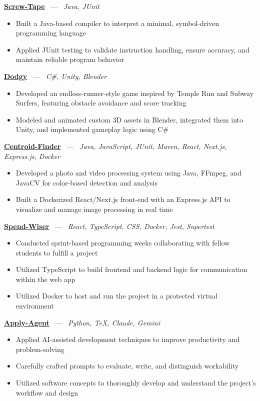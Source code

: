 \documentclass[10pt, letterpaper]{article}
\newcommand{\projhead}[3]{%
  \vspace{5pt}%
  {\bfseries\color{dark}\href{#2}{#1}}%
  ~{\color{light}---}~%
  {\color{light}\small\textit{#3}}\\[-2pt]%
}
\begin{document}
\projhead{Screw-Tape}{https://github.com/timmyd4/screwtape}{Java, JUnit}
\begin{itemize}
  \item Built a Java-based compiler to interpret a minimal, symbol-driven programming language
  \item Applied JUnit testing to validate instruction handling, ensure accuracy, and maintain reliable program behavior
\end{itemize}

\projhead{Dodgy}{https://timyd.itch.io/dodgy}{C\#, Unity, Blender}
\begin{itemize}
  \item Developed an endless-runner-style game inspired by Temple Run and Subway Surfers, featuring obstacle avoidance and score tracking
  \item Modeled and animated custom 3D assets in Blender, integrated them into Unity, and implemented gameplay logic using C\#
\end{itemize}

\projhead{Centroid-Finder}{https://github.com/xavierb117/centroid-finder}{Java, JavaScript, JUnit, Maven, React, Next.js, Express.js, Docker}
\begin{itemize}
  \item Developed a photo and video processing system using Java, FFmpeg, and JavaCV for color-based detection and analysis
  \item Built a Dockerized React/Next.js front-end with an Express.js API to visualize and manage image processing in real time
\end{itemize}

\projhead{Spend-Wiser}{https://github.com/JesseChum/w26-sdev372-spendwiser-finance-tracker}{React, TypeScript, CSS, Docker, Jest, Supertest}
\begin{itemize}
  \item Conducted sprint-based programming weeks collaborating with fellow students to fulfill a project
  \item Utilized TypeScript to build frontend and backend logic for communication within the web app
  \item Utilized Docker to host and run the project in a protected virtual environment
\end{itemize}

\projhead{Apply-Agent}{https://github.com/timmyd4/apply-agent}{Python, TeX, Claude, Gemini}
\begin{itemize}
  \item Applied AI-assisted development techniques to improve productivity and problem-solving
  \item Carefully crafted prompts to evaluate, write, and distinguish workability
  \item Utilized software concepts to thoroughly develop and understand the project's workflow and design
\end{itemize}
\end{document}
